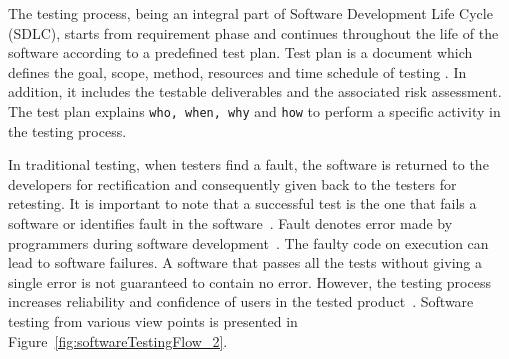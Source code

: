 The testing process, being an integral part of Software Development Life Cycle (SDLC), starts from requirement phase and continues throughout the life of the software according to a predefined test plan. Test plan is a document which defines the goal, scope, method, resources and time schedule of testing \cite{futrell2001quality}. In addition, it includes the testable deliverables and the associated risk assessment. The test plan explains \verb+who, when, why+ and \verb+how+ to perform a specific activity in the testing process. 

In traditional testing, when testers find a fault, the software is returned to the developers for rectification and consequently given back to the testers for retesting. It is important to note that a successful test is the one that fails a software or identifies fault in the software~\cite{myers2011art}. Fault denotes error made by programmers during software development~\cite{american1984}. The faulty code on execution can lead to software failures. A software that passes all the tests without giving a single error is not guaranteed to contain no error. However, the testing process increases reliability and confidence of users in the tested product~\cite{give digkstra reference}. Software testing from various view points is presented in Figure~\ref{fig:softwareTestingFlow_2}.


